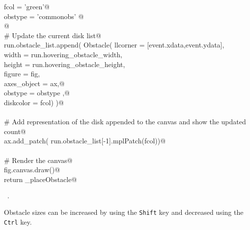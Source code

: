 \documentclass[11.5pt]{report}
\begin{document}
\begin{flushleft}
\begin{list}{}{}
\mbox{}\verb@                     fcol = 'green'@\\
\mbox{}\verb@                     obstype = 'commonobs' @\\
\mbox{}\verb@ @\\
\mbox{}\verb@                # Update the current disk list@\\
\mbox{}\verb@                run.obstacle_list.append( Obstacle( llcorner = [event.xdata,event.ydata], \@\\
\mbox{}\verb@                                             width = run.hovering_obstacle_width, \@\\
\mbox{}\verb@                                             height = run.hovering_obstacle_height, \@\\
\mbox{}\verb@                                             figure      = fig, \@\\
\mbox{}\verb@                                             axes_object = ax,@\\
\mbox{}\verb@                                             obstype     = obstype  ,@\\
\mbox{}\verb@                                             diskcolor   = fcol)  )@\\
\mbox{}\verb@@\\
\mbox{}\verb@                # Add representation of the disk appended to the canvas and show the updated count@\\
\mbox{}\verb@                ax.add_patch( run.obstacle_list[-1].mplPatch(fcol))@\\
\mbox{}\verb@@\\
\mbox{}\verb@                # Render the canvas@\\
\mbox{}\verb@                fig.canvas.draw()@\\
\mbox{}\verb@        return _placeObstacle@\\
\mbox{}\verb@@{\NWsep}
\end{list}
\vspace{-1.5ex}
\footnotesize
\begin{list}{}{\setlength{\itemsep}{-\parsep}\setlength{\itemindent}{-\leftmargin}}
\item \NWtxtMacroRefIn\ .

\item{}
\end{list}
\vspace{4ex}
\end{flushleft}

Obstacle sizes can be increased by using the \verb|Shift| key and decreased using the \verb|Ctrl| key. 
\end{document}
